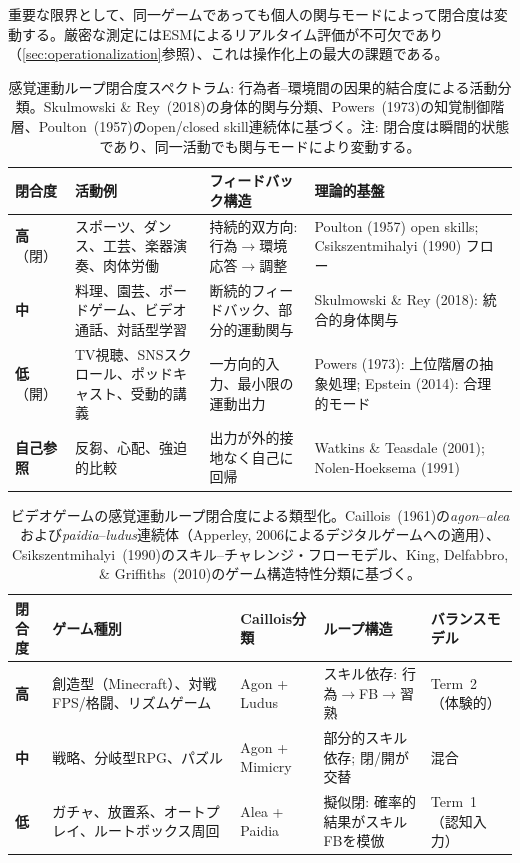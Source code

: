\documentclass[a4paper,11pt,titlepage]{article}
\begin{document}
重要な限界として、同一ゲームであっても個人の関与モードによって閉合度は変動する。厳密な測定にはESMによるリアルタイム評価が不可欠であり（\cref{sec:operationalization}参照）、これは操作化上の最大の課題である。

\begin{table}[htbp]
\centering
\caption{感覚運動ループ閉合度スペクトラム: 行為者--環境間の因果的結合度による活動分類。Skulmowski \& Rey~(2018)の身体的関与分類、Powers~(1973)の知覚制御階層、Poulton~(1957)のopen/closed skill連続体に基づく。注: 閉合度は瞬間的状態であり、同一活動でも関与モードにより変動する。}
\label{tab:loop-spectrum}
\begin{tabular}{p{2cm}p{3.5cm}p{3.5cm}p{3.5cm}}
\toprule
\textbf{閉合度} & \textbf{活動例} & \textbf{フィードバック構造} & \textbf{理論的基盤} \\
\midrule
\textbf{高}（閉） & スポーツ、ダンス、工芸、楽器演奏、肉体労働 & 持続的双方向: 行為$\to$環境応答$\to$調整 & Poulton (1957) open skills; Csikszentmihalyi (1990) フロー \\
\addlinespace
\textbf{中} & 料理、園芸、ボードゲーム、ビデオ通話、対話型学習 & 断続的フィードバック、部分的運動関与 & Skulmowski \& Rey (2018): 統合的身体関与 \\
\addlinespace
\textbf{低}（開） & TV視聴、SNSスクロール、ポッドキャスト、受動的講義 & 一方向的入力、最小限の運動出力 & Powers (1973): 上位階層の抽象処理; Epstein (2014): 合理的モード \\
\addlinespace
\textbf{自己参照} & 反芻、心配、強迫的比較 & 出力が外的接地なく自己に回帰 & Watkins \& Teasdale (2001); Nolen-Hoeksema (1991) \\
\bottomrule
\end{tabular}
\end{table}

\begin{table}[htbp]
\centering
\caption{ビデオゲームの感覚運動ループ閉合度による類型化。Caillois~(1961)の\emph{agon}--\emph{alea}および\emph{paidia}--\emph{ludus}連続体（Apperley, 2006によるデジタルゲームへの適用）、Csikszentmihalyi~(1990)のスキル--チャレンジ・フローモデル、King, Delfabbro, \& Griffiths~(2010)のゲーム構造特性分類に基づく。}
\label{tab:game-typology}
\begin{tabular}{p{1.8cm}p{3.2cm}p{2.5cm}p{2.5cm}p{2.5cm}}
\toprule
\textbf{閉合度} & \textbf{ゲーム種別} & \textbf{Caillois分類} & \textbf{ループ構造} & \textbf{バランスモデル} \\
\midrule
\textbf{高} & 創造型（Minecraft）、対戦FPS/格闘、リズムゲーム & Agon + Ludus & スキル依存: 行為$\to$FB$\to$習熟 & Term~2（体験的） \\
\addlinespace
\textbf{中} & 戦略、分岐型RPG、パズル & Agon + Mimicry & 部分的スキル依存; 閉/開が交替 & 混合 \\
\addlinespace
\textbf{低} & ガチャ、放置系、オートプレイ、ルートボックス周回 & Alea + Paidia & 擬似閉: 確率的結果がスキルFBを模倣 & Term~1（認知入力） \\
\bottomrule
\end{tabular}
\end{table}
\end{document}
